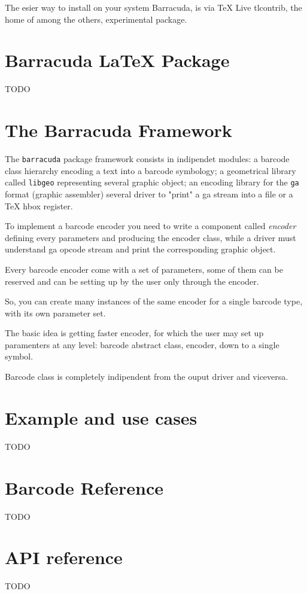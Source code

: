 \documentclass{article}
\newcommand{\code}[1]{\texttt{#1}}
\newcommand{\brcd}{\code{barracuda}}
\begin{document}
The esier way to install on your system Barracuda, is via TeX Live tlcontrib,
the home of among the others, experimental package.


\section{Barracuda \LaTeX{} Package}
\label{secLaTeXPkg}

TODO


\section{The Barracuda Framework}
\label{secFramework}

The \brcd{} package framework consists in indipendet modules: a barcode class
hierarchy encoding a text into a barcode symbology; a geometrical library called
\code{libgeo} representing several graphic object; an encoding library for the
\code{ga} format (graphic assembler) several driver to "print" a ga stream
into a file or a \TeX{} hbox register.

To implement a barcode encoder you need to write a component called
\emph{encoder} defining every parameters and producing the encoder class, while
a driver must understand ga opcode stream and print the corresponding graphic
object.

Every barcode encoder come with a set of parameters, some of them can be
reserved and can be setting up by the user only through the encoder.

So, you can create many instances of the same encoder for a single barcode
type, with its own parameter set.

The basic idea is getting faster encoder, for which the user may set up
paramenters at any level: barcode abstract class, encoder, down to a single
symbol.

Barcode class is completely indipendent from the ouput driver and viceversa.

\section{Example and use cases}
\label{secExample}

TODO

\section{Barcode Reference}
\label{secBcRef}

TODO

\section{API reference}
\label{secAPI}

TODO
\end{document}
